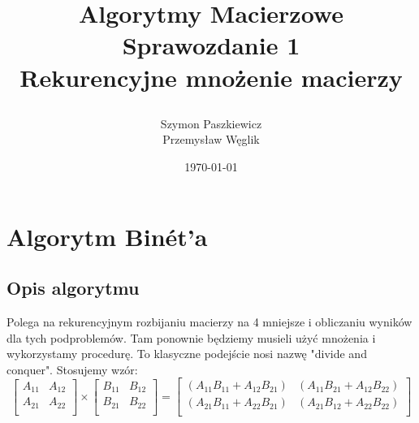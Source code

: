 \documentclass[12pt,a4paper,table]{article}
\begin{document}
    \title {
        Algorytmy Macierzowe \\
        Sprawozdanie 1 \\
        Rekurencyjne mnożenie macierzy

    }

    \author{
        Szymon Paszkiewicz \\
        Przemysław Węglik
    }

    \date{\today}

    \maketitle

    \tableofcontents
    \newpage

    \section{Algorytm Binét'a}

    \subsection{Opis algorytmu}
    Polega na rekurencyjnym rozbijaniu macierzy na 4 mniejsze i 
    obliczaniu wyników dla tych podproblemów. Tam ponownie
    będziemy musieli użyć mnożenia i wykorzystamy procedurę.
    To klasyczne podejście nosi nazwę "divide and conquer".
    Stosujemy wzór:
    $$
    \begin{bmatrix}
        A_{11} & A_{12} \\
        A_{21} & A_{22} \\ 
    \end{bmatrix}
    \times
    \begin{bmatrix}
        B_{11} & B_{12} \\
        B_{21} & B_{22} \\ 

    \end{bmatrix}
    =
    \begin{bmatrix}
        (A_{11}B_{11} + A_{12}B_{21}) & (A_{11}B_{21} + A_{12}B_{22}) \\
        (A_{21}B_{11} + A_{22}B_{21}) & (A_{21}B_{12} + A_{22}B_{22}) \\ 
    \end{bmatrix}
    $$
    
\end{document}
